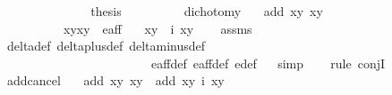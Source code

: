 \begin{isabellebody}
\isanewline
\ \ \ \ \ \ \isamarkupfalse%
\isanewline
\ \ \ \ \ \ \isamarkupfalse%
\ {\isacharquery}thesis\ \isamarkupfalse%
\isanewline
\ \ \ \ \isamarkupfalse%
\isanewline
\ \ \isamarkupfalse%
%
\endisatagproof
{\isafoldproof}%
%
\isadelimproof
\isanewline
%
\endisadelimproof
\isanewline
{}\isamarkupfalse%
\ dichotomy{\isacharunderscore}{}{\isacharcolon}\isanewline
\ \ \ {\isachardoublequoteopen}add\ {\isacharparenleft}x{}{\isacharcomma}y{}{\isacharparenright}\ {\isacharparenleft}x{}{\isacharcomma}y{}{\isacharparenright}\ {\isacharequal}\ {\isacharparenleft}{}{\isacharcomma}{}{\isacharparenright}{\isachardoublequoteclose}\ \isanewline
\ \ \ \ \ \ \ \ \ \ {\isachardoublequoteopen}{\isacharparenleft}{\isacharparenleft}x{}{\isacharcomma}y{}{\isacharparenright}{\isacharcomma}{\isacharparenleft}x{}{\isacharcomma}y{}{\isacharparenright}{\isacharparenright}\ {\isasymin}\ e{\isacharunderscore}aff{\isacharunderscore}{}{\isachardoublequoteclose}\isanewline
\ \ \ {\isachardoublequoteopen}{\isacharparenleft}x{}{\isacharcomma}y{}{\isacharparenright}\ {\isacharequal}\ i\ {\isacharparenleft}x{}{\isacharcomma}y{}{\isacharparenright}{\isachardoublequoteclose}\isanewline
%
\isadelimproof
\ \ %
\endisadelimproof
%
\isatagproof
{}\isamarkupfalse%
\ assms\ \isamarkupfalse%
\ delta{\isacharunderscore}def\ delta{\isacharunderscore}plus{\isacharunderscore}def\ delta{\isacharunderscore}minus{\isacharunderscore}def\ \isanewline
\ \ \ \ \ \ \ \ \ \ \ \ \ \ \ \ \ \ \ \ \ \ \ \ e{\isacharunderscore}aff{\isacharunderscore}{}{\isacharunderscore}def\ e{\isacharunderscore}aff{\isacharunderscore}def\ e{\isacharprime}{\isacharunderscore}def\isanewline
\ \ \isamarkupfalse%
{\isacharparenleft}simp{\isacharparenright}\ \isanewline
\ \ \isamarkupfalse%
{\isacharparenleft}rule\ conjI{\isacharparenright}\isanewline
\ \ \ \isamarkupfalse%
\ {}\isanewline
\ \ \isanewline
\ \ \isamarkupfalse%
%
\endisatagproof
{\isafoldproof}%
%
\isadelimproof
\isanewline
%
\endisadelimproof
\isanewline
{}\isamarkupfalse%
\ add{\isacharunderscore}cancel{\isacharunderscore}{}{\isacharcolon}\isanewline
\ \ \ {\isachardoublequoteopen}add\ {\isacharparenleft}x{}{\isacharcomma}y{}{\isacharparenright}\ {\isacharparenleft}x{}{\isacharcomma}y{}{\isacharparenright}\ {\isacharequal}\ add\ {\isacharparenleft}x{}{\isacharcomma}y{}{\isacharparenright}\ {\isacharparenleft}i\ {\isacharparenleft}x{}{\isacharcomma}y{}{\isacharparenright}{\isacharparenright}{\isachardoublequoteclose}\isanewline

\end{isabellebody}
